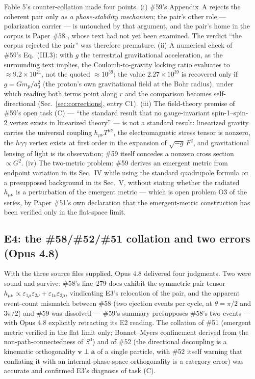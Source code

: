 \documentclass[%
 reprint, amsmath,amssymb, aps, prb, ]{revtex4-2}
\numberwithin{equation}{section}
\newcommand{\iphase}{\theta}  %
\begin{document}
Fable 5's counter-collation made four points. (i) \#59's Appendix~A rejects the coherent pair only \emph{as a phase-stability mechanism}; the pair's other role --- polarization carrier --- is untouched by that argument, and the pair's home in the corpus is Paper \#58 \cite{hanamura58}, whose text had not yet been examined. The verdict ``the corpus rejected the pair'' was therefore premature. (ii) A numerical check of \#59's Eq.~(III.3): with $g$ the terrestrial gravitational acceleration, as the surrounding text implies, the Coulomb-to-gravity locking ratio evaluates to $\approx 9.2\times10^{21}$, not the quoted $\approx 10^{39}$; the value $2.27\times10^{39}$ is recovered only if $g=Gm_p/a_0^2$ (the proton's own gravitational field at the Bohr radius), under which reading both terms point along $\hat r$ and the comparison becomes self-directional (Sec.~\ref{sec:corrections}, entry C1). (iii) The field-theory premise of \#59's open task (C) --- ``the standard result that no gauge-invariant spin-1--spin-2 vertex exists in linearized theory'' --- is not a standard result: linearized gravity carries the universal coupling $h_{\mu\nu}T^{\mu\nu}$, the electromagnetic stress tensor is nonzero, the $h\gamma\gamma$ vertex exists at first order in the expansion of $\sqrt{-g}\,F^2$, and gravitational lensing of light is its observation; \#59 itself concedes a nonzero cross section $\propto G^2$. (iv) The two-metric problem: \#59 derives an emergent metric from endpoint variation in its Sec.~IV while using the standard quadrupole formula on a presupposed background in its Sec.~V, without stating whether the radiated $h_{\mu\nu}$ is a perturbation of the emergent metric --- which is open problem O3 of the series, by Paper \#51's own declaration \cite{hanamura51} that the emergent-metric construction has been verified only in the flat-space limit.

\subsection{E4: the \#58/\#52/\#51 collation and two errors (Opus 4.8)}

With the three source files supplied, Opus 4.8 delivered four judgments. Two were sound and survive: \#58's line~279 does exhibit the symmetric pair tensor $h_{\mu\nu}\propto \varepsilon_{1\mu}\varepsilon_{2\nu}+\varepsilon_{1\nu}\varepsilon_{2\mu}$, vindicating E3's relocation of the pair, and the apparent event-count mismatch between \#58 (two ejection events per cycle, at $\iphase=\pi/2$ and $3\pi/2$) and \#59 was dissolved --- \#59's summary presupposes \#58's two events --- with Opus 4.8 explicitly retracting its E2 reading. The collation of \#51 (emergent metric verified in the flat limit only; Bonnet--Myers confinement derived from the non-path-connectedness of $S^0$) and of \#52 \cite{hanamura52} (the directional decoupling is a kinematic orthogonality $\mathbf v\perp\mathbf a$ of a single particle, with \#52 itself warning that conflating it with an internal-phase-space orthogonality is a category error) was accurate and confirmed E3's diagnosis of task (C).
\end{document}
